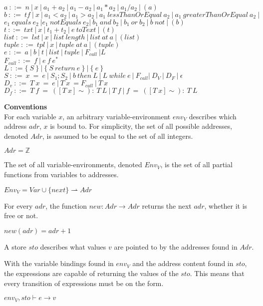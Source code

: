 $a\ ::=\ n\ |\ x\ |\ a_1+a_2\ |\ a_1-a_2\ |\ a_1*a_2\ |\ a_1/a_2\ |\ (a)$\\
$b\ ::=\ tf\ |\ x\ |\ a_1<a_2\ |\ a_1>a_2\ |\ a_1\ lessThanOrEqual\ a_2\ |\ a_1\ greaterThanOrEqual\ a_2\ |$\\ 
\phantom{xyzq.} $ e_1\ equals\ e_2\ | e_1\ notEquals\ e_2|\ b_1\ and\ b_2\ |\ b_1\ or\ b_2\ |\ b\ not\ | \ (b)$\\
$t\ ::=\ txt\ |\ x\ |\ t_1+t_2\ |\ e\ toText\ |\ (t)$\\
$list\  ::=\ lst\ |\ x\ |\ list\ length\ |\ list\ at\ a\ |\ (list)$\\
$tuple\ ::=\ tpl\ |\ x\ |\ tuple\ at\ a\ |\ (tuple)$\\
$e\     ::=\ a\ |\ b\ |\ t\ |\ list\ |\ tuple\ |\ F_{call}\ | L$\\
$F_{call}\ ::=\ f\ |\ e\ f\ e^*$\\
$L\     ::= \{\ S\ \}\ |\ \{\ S\ return\ e\ \}\ |\ \{\ e\ \}$\\
$S\     ::=\ x\ =\ e\ |\ S_1;S_2\ |\ b\ then\ L\ |\ L\ while\ e\ |\ F_{call} |\ D_V\ |\ D_F\ |\ \epsilon$\\
$D_v\   ::=\ T\ x\ =\ e\ |\ T\ x\ = F_{call}\ |\ T\ x\ $\\
$D_f\   ::=\ T\ f\ =\ ([T\ x]\sim):\ T\ L\ |\ T\ f\ |\ f\ =\ ([T\ x]\sim):\ T\ L$

\textbf{\large{Conventions}} \\
For each variable $x$, an arbitrary variable-environment $env_V$ describes which address $adr$, $x$ is bound to.
For simplicity, the set of all possible addresses, denoted $Adr$, is assumed to be equal to the set of all integers.
\begin{center}
	$Adr = \mathbb{Z}$
\end{center}
The set of all variable-environments, denoted \textbf{$Env_V$}, is the set of all partial functions from variables to addresses.
\begin{center}
	$Env_V = Var \cup \{next\} \rightharpoonup Adr$
\end{center}
For every $adr$, the function $new : Adr \rightarrow Adr$ returns the next $adr$, whether it is free or not.
\begin{center}
	$new (adr) = adr + 1$
\end{center}
A store $sto$ describes what values $v$ are pointed to by the addresses found in $Adr$.

With the variable bindings found in $env_V$ and the address content found in $sto$, the expressions are capable of returning the values of the $sto$.
This means that every transition of expressions must be on the form.
\begin{center}
	$env_V,sto \vdash e \rightarrow v$
\end{center} 

